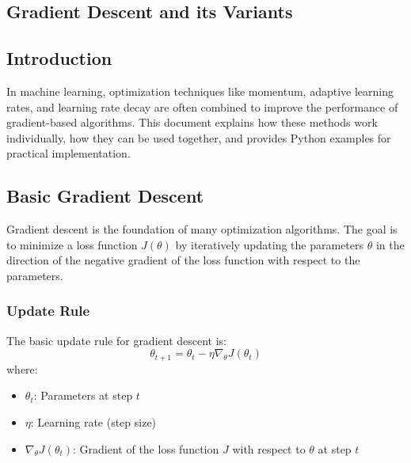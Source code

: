 \begin{notechapter}
\lstset{style=mystyle}
\chapter{Gradient Descent and its Variants}\label{ch:optimizers}

\section{Introduction}
In machine learning, optimization techniques like momentum, 
adaptive learning rates, and learning rate decay are often 
combined to improve the performance of gradient-based 
algorithms. This document explains how these methods work 
individually, how they can be used together, and provides 
Python examples for practical implementation.

\section{Basic Gradient Descent}
Gradient descent is the foundation of many optimization 
algorithms. The goal is to minimize a loss function 
\( J(\theta) \) by iteratively updating the parameters 
\(\theta\) in the direction of the negative gradient of 
the loss function with respect to the parameters.

\subsection{Update Rule}
The basic update rule for gradient descent is:
\[
\theta_{t+1} = \theta_t - \eta \nabla_\theta J(\theta_t)
\]
where:
\begin{itemize}
    \item \(\theta_t\): Parameters at step \(t\)
    \item \(\eta\): Learning rate (step size)
    \item \(\nabla_\theta J(\theta_t)\): Gradient of the 
          loss function \(J\) with respect to \(\theta\) 
          at step \(t\)
\end{itemize}


\end{notechapter}

